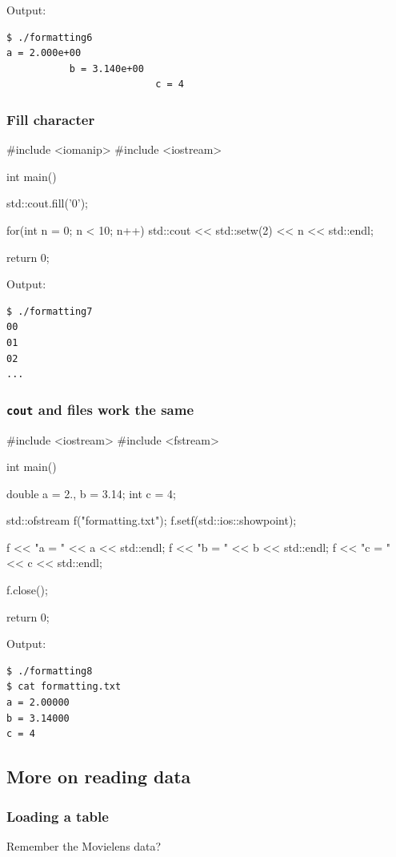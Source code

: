 \documentclass[12pt,letterpaper,twoside]{article}
\begin{document}
Output:

\begin{verbatim}
$ ./formatting6
a = 2.000e+00
           b = 3.140e+00
                          c = 4
\end{verbatim}

\subsubsection{Fill character}
\begin{cpp}
#include <iomanip>
#include <iostream>

int main() {

  std::cout.fill('0');

  for(int n = 0; n < 10; n++) {
    std::cout << std::setw(2) << n << std::endl;
  }

  return 0;
}
\end{cpp}

Output:

\begin{verbatim}
$ ./formatting7
00
01
02
...
\end{verbatim}

\subsubsection{\texorpdfstring{\texttt{cout} and files work the same}{cout and files work the same}}
\begin{cpp}
#include <iostream>
#include <fstream>

int main() {
  double a = 2., b = 3.14;
  int c = 4;

  std::ofstream f("formatting.txt");
  f.setf(std::ios::showpoint);

  f << "a = " << a << std::endl;
  f << "b = " << b << std::endl;
  f << "c = " << c << std::endl;

  f.close();

  return 0;
}
\end{cpp}

Output:

\begin{verbatim}
$ ./formatting8
$ cat formatting.txt
a = 2.00000
b = 3.14000
c = 4
\end{verbatim}

\subsection{More on reading data}
\subsubsection{Loading a table}
Remember the Movielens data?
\end{document}
